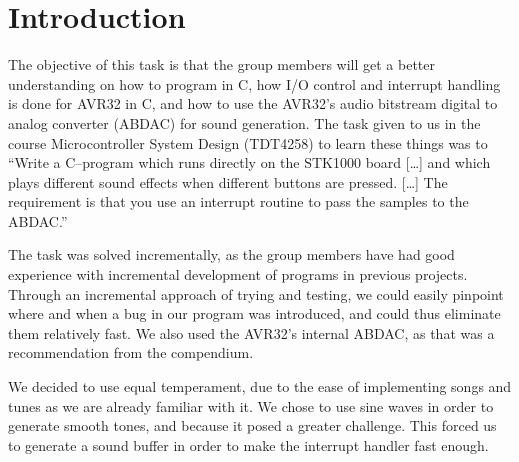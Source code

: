 \section{Introduction}

The objective of this task is that the group members will get a better
understanding on how to program in C, how I/O control and interrupt
handling is done for AVR32 in C, and how to use the AVR32's audio
bitstream digital to analog converter (ABDAC) for sound generation. The
task given to us in the course Microcontroller System Design (TDT4258)
to learn these things was to ``Write a C–program which runs directly on
the STK1000 board [\ldots] and which plays different sound effects when
different buttons are pressed. [\ldots] The requirement is that you use
an interrupt routine to pass the samples to the ABDAC.''\cite{comp}

The task was solved incrementally, as the group members have had good
experience with incremental development of programs in previous
projects. Through an incremental approach of trying and testing, we
could easily pinpoint where and when a bug in our program was
introduced, and could thus eliminate them relatively fast. We also used
the AVR32's internal ABDAC, as that was a recommendation from the
compendium.

We decided to use equal temperament, due to the ease of implementing
songs and tunes as we are already familiar with it. We chose to use sine
waves in order to generate smooth tones, and because it posed a greater
challenge. This forced us to generate a sound buffer in order to make
the interrupt handler fast enough.
